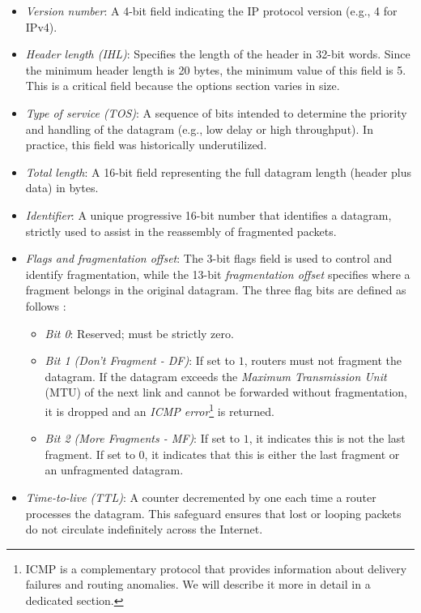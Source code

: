 \begin{itemize}
    \item \emph{Version number}: A 4-bit field indicating the IP protocol version (e.g., 4 for IPv4).
    \item \emph{Header length (IHL)}: Specifies the length of the header in 32-bit words. Since the minimum header length is 20 bytes, the minimum value of this field is 5. This is a critical field because the options section varies in size.
    \item \emph{Type of service (TOS)}: A sequence of bits intended to determine the priority and handling of the datagram (e.g., low delay or high throughput). In practice, this field was historically underutilized.
    \item \emph{Total length}: A 16-bit field representing the full datagram length (header plus data) in bytes.
    \item \emph{Identifier}: A unique progressive 16-bit number that identifies a datagram, strictly used to assist in the reassembly of fragmented packets.
    \item \emph{Flags and fragmentation offset}: The 3-bit flags field is used to control and identify fragmentation, while the 13-bit \emph{fragmentation offset} specifies where a fragment belongs in the original datagram. The three flag bits are defined as follows \cite{rfc791}:
    \begin{itemize}
        \item \emph{Bit 0}: Reserved; must be strictly zero.
        \item \emph{Bit 1 (Don't Fragment - DF)}: If set to \(1\), routers must not fragment the datagram. If the datagram exceeds the \emph{Maximum Transmission Unit} (MTU) of the next link and cannot be forwarded without fragmentation, it is dropped and an \emph{ICMP error}\footnote{ICMP is a complementary protocol that provides information about delivery failures and routing anomalies. We will describe it more in detail in a dedicated section.} is returned.
        \item \emph{Bit 2 (More Fragments - MF)}: If set to \(1\), it indicates this is not the last fragment. If set to \(0\), it indicates that this is either the last fragment or an unfragmented datagram.
    \end{itemize}
    \item \emph{Time-to-live (TTL)}: A counter decremented by one each time a router processes the datagram. This safeguard ensures that lost or looping packets do not circulate indefinitely across the Internet.

\end{itemize}
